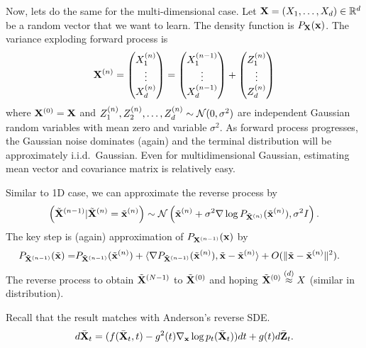 \documentclass[11pt, a4paper]{article}
\begin{document}
Now, lets do the same for the multi-dimensional case.
Let ${\bf X}=(X_1, \dots, X_d)\in\mathbb{R}^d$ be a random vector that we want to learn.
The density function is $P_{{\bf X}}({\bf x})$.
The variance exploding forward process is 
\begin{align}
    {\bf X}^{(n)} = \begin{pmatrix} X^{(n)}_1 \\ \vdots\\X^{(n)}_d \end{pmatrix}
    = \begin{pmatrix} X^{(n-1)}_1 \\ \vdots\\X^{(n-1)}_d \end{pmatrix}
    + \begin{pmatrix} Z^{(n)}_1 \\ \vdots \\ Z^{(n)}_d \end{pmatrix}
\end{align}
where ${\bf X}^{(0)} = {\bf X}$ and $Z^{(n)}_1, Z^{(n)}_2, \dots, Z^{(n)}_d\sim{\cal N}(0, \sigma^2)$ are independent Gaussian random variables 
with mean zero and variable $\sigma^2$.
As forward process progresses, the Gaussian noise dominates (again) and the terminal distribution will be approximately i.i.d.~Gaussian.
Even for multidimensional Gaussian, estimating mean vector and covariance matrix is relatively easy.


Similar to 1D case, we can approximate the reverse process by
\begin{align}
    \left(\tilde{{\bf X}}^{(n-1)} | \tilde{{\bf X}}^{(n)}=\tilde{{\bf x}}^{(n)} \right)\sim {\cal N}\left(\tilde{{\bf x}}^{(n)} + \sigma^2 \nabla \log P_{\tilde{{\bf X}}^{(n)}}(\tilde{{\bf x}}^{(n)}), \sigma^2 I\right).
\end{align}
The key step is (again) approximation of $P_{{\bf X}^{(n-1)}}({\bf x})$ by 
\begin{align}
    P_{\tilde{{\bf X}}^{(n-1)}}(\tilde{{\bf x}}) =& P_{\tilde{{\bf X}}^{(n-1)}}(\tilde{{\bf x}}^{(n)}) + \langle \nabla P_{\tilde{{\bf X}}^{(n-1)}}(\tilde{{\bf x}}^{(n)}), \tilde{{\bf x}}-\tilde{{\bf x}}^{(n)}\rangle + O(\|\tilde{{\bf x}}-\tilde{{\bf x}}^{(n)}\|^2).
\end{align}
The reverse process to obtain $\tilde{{\bf X}}^{(N-1)}$ to $\tilde{{\bf X}}^{(0)}$ 
and hoping $\tilde{{\bf X}}^{(0)} \stackrel{(d)}{\approx} X$ (similar in distribution).

Recall that the result matches with Anderson's reverse SDE.
\begin{align}
    d\bar{{\bf X}}_t = (f(\bar{{\bf X}}_t, t) - g^2(t) \nabla_{{\bf x}}\log p_t(\bar{{\bf X}}_t))dt+g(t) d\bar{{\bf Z}}_t.
\end{align}
\end{document}
